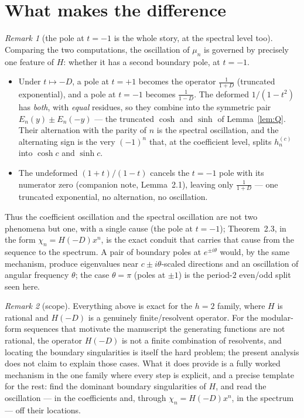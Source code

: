 \documentclass[11pt, fleqn]{amsart}
\theoremstyle{remark}
\newtheorem{remark}{Remark}
\begin{document}
\section{What makes the difference}

\begin{remark}[the pole at $t=-1$ is the whole story, at the spectral level too]
Comparing the two computations, the oscillation of $\mu_n$ is governed by precisely one
feature of $H$: whether it has a second boundary pole, at $t=-1$.
\begin{itemize}
\item Under $t\mapsto -D$, a pole at $t=+1$ becomes the operator $\tfrac1{1+D}$ (truncated
exponential), and a pole at $t=-1$ becomes $\tfrac1{1-D}$. The deformed $1/(1-t^2)$ has
\emph{both}, with \emph{equal} residues, so they combine into the symmetric pair
$E_n(y)\pm E_n(-y)$ --- the truncated $\cosh$ and $\sinh$ of Lemma~\ref{lem:Q}. Their
alternation with the parity of $n$ is the spectral oscillation, and the alternating sign
is the very $(-1)^n$ that, at the coefficient level, splits $h^{(c)}_n$ into $\cosh c$ and
$\sinh c$.
\item The undeformed $(1+t)/(1-t)$ cancels the $t=-1$ pole with its numerator zero
(companion note, Lemma~2.1), leaving only $\tfrac1{1+D}$ --- one truncated exponential,
no alternation, no oscillation.
\end{itemize}
Thus the coefficient oscillation and the spectral oscillation are not two phenomena but
one, with a single cause (the pole at $t=-1$); Theorem~2.3, in the form
$\chi_n=H(-D)x^n$, is the exact conduit that carries that cause from the sequence to the
spectrum. A pair of boundary poles at $e^{\pm i\theta}$ would, by the same mechanism,
produce eigenvalues near $c\pm i\theta$-scaled directions and an oscillation of angular
frequency $\theta$; the case $\theta=\pi$ (poles at $\pm1$) is the period-$2$ even/odd
split seen here.
\end{remark}

\begin{remark}[scope]
Everything above is exact for the $h=2$ family, where $H$ is rational and $H(-D)$ is a
genuinely finite/resolvent operator. For the modular-form sequences that motivate the
manuscript the generating functions are not rational, the operator $H(-D)$ is not a finite
combination of resolvents, and locating the boundary singularities is itself the hard
problem; the present analysis does not claim to explain those cases. What it does provide
is a fully worked mechanism in the one family where every step is explicit, and a precise
template for the rest: find the dominant boundary singularities of $H$, and read the
oscillation --- in the coefficients and, through $\chi_n=H(-D)x^n$, in the spectrum ---
off their locations.
\end{remark}
\end{document}

